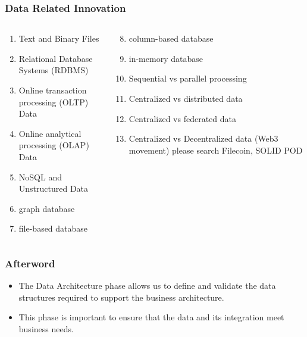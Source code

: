 \documentclass[aspectratio=169, table]{beamer}
\begin{document}
    \begin{frame}
        \frametitle{Data Related Innovation}
        \begin{columns}
            \begin{column}{0.5\textwidth}
                \begin{center}
                    \begin{enumerate}
                        \item Text and Binary Files
                        \item Relational Database Systems (RDBMS)
                        \item Online transaction processing (OLTP) Data
                        \item Online analytical processing (OLAP) Data
                        \item NoSQL and Unstructured Data
                        \item graph database
                        \item file-based database
                    \end{enumerate}
                \end{center}
            \end{column}
            \begin{column}{0.5\textwidth}
                \begin{center}
                    \begin{enumerate}
                        \setcounter{enumi}{7}
                        \item column-based database
                        \item in-memory database
                        \item Sequential vs parallel processing
                        \item Centralized vs distributed data
                        \item Centralized vs federated data
                        \item Centralized vs Decentralized data (Web3 movement) please search Filecoin, SOLID POD
                    \end{enumerate}
                \end{center}
            \end{column}
        \end{columns}
    \end{frame}


    \begin{frame}
        \frametitle{Afterword}
        \begin{itemize}
            \item The Data Architecture phase allows us to define and validate the data structures required to support the business architecture.
            \item This phase is important to ensure that the data and its integration meet business needs.
        \end{itemize}
    \end{frame}
\end{document}
